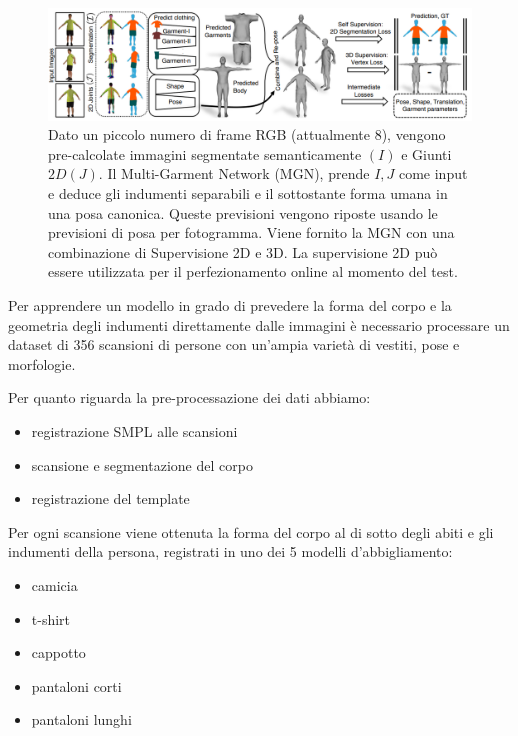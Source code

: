 \begin{figure}[ht!]
  \centering
  \includegraphics[scale=0.5]{Images/SizerPic/Sizer4.png}
  \caption{Dato un piccolo numero di frame RGB (attualmente 8), vengono pre-calcolate immagini segmentate semanticamente
$(I)$ e Giunti $2D (J)$. Il Multi-Garment Network (MGN), prende ${I,J}$ come input e deduce gli indumenti separabili e il sottostante
forma umana in una posa canonica. Queste previsioni vengono riposte usando le previsioni di posa per fotogramma. Viene fornito la  MGN con una combinazione di Supervisione 2D e 3D. La supervisione 2D può essere utilizzata per il perfezionamento online al momento del test.}
    \label{fig:Sizer4}
\end{figure}

\newpage

Per apprendere un modello in grado di prevedere la forma del corpo e la geometria degli indumenti direttamente dalle immagini è necessario processare un dataset di 356 scansioni di persone con un’ampia varietà di vestiti, pose e morfologie.

\medskip

Per quanto riguarda la pre-processazione dei dati abbiamo:
\begin{itemize}
\item registrazione SMPL alle scansioni
\item scansione e segmentazione del corpo
\item registrazione del template
\end{itemize}

\medskip

Per ogni scansione viene ottenuta la forma del corpo al di sotto degli abiti e gli indumenti della persona, registrati in uno dei 5 modelli d’abbigliamento:
\begin{itemize}
\item camicia
\item t-shirt
\item cappotto
\item pantaloni corti
\item pantaloni lunghi
\end{itemize}


